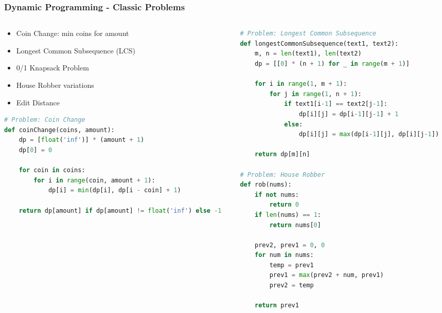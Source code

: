 \begin{frame}[fragile]\frametitle{Dynamic Programming - Classic Problems}
\begin{columns}
    \begin{column}[T]{0.5\linewidth}
      \begin{itemize}
        \item Coin Change: min coins for amount
        \item Longest Common Subsequence (LCS)
        \item 0/1 Knapsack Problem
        \item House Robber variations
        \item Edit Distance
      \end{itemize}
	  
     \begin{lstlisting}[language=python, basicstyle=\tiny]
# Problem: Coin Change
def coinChange(coins, amount):
    dp = [float('inf')] * (amount + 1)
    dp[0] = 0
    
    for coin in coins:
        for i in range(coin, amount + 1):
            dp[i] = min(dp[i], dp[i - coin] + 1)
    
    return dp[amount] if dp[amount] != float('inf') else -1
      \end{lstlisting}	  
    \end{column}
    \begin{column}[T]{0.5\linewidth}
      \begin{lstlisting}[language=python, basicstyle=\tiny]
# Problem: Longest Common Subsequence
def longestCommonSubsequence(text1, text2):
    m, n = len(text1), len(text2)
    dp = [[0] * (n + 1) for _ in range(m + 1)]
    
    for i in range(1, m + 1):
        for j in range(1, n + 1):
            if text1[i-1] == text2[j-1]:
                dp[i][j] = dp[i-1][j-1] + 1
            else:
                dp[i][j] = max(dp[i-1][j], dp[i][j-1])
    
    return dp[m][n]

# Problem: House Robber
def rob(nums):
    if not nums:
        return 0
    if len(nums) == 1:
        return nums[0]
    
    prev2, prev1 = 0, 0
    for num in nums:
        temp = prev1
        prev1 = max(prev2 + num, prev1)
        prev2 = temp
    
    return prev1
      \end{lstlisting}

    \end{column}
  \end{columns}
\end{frame}


